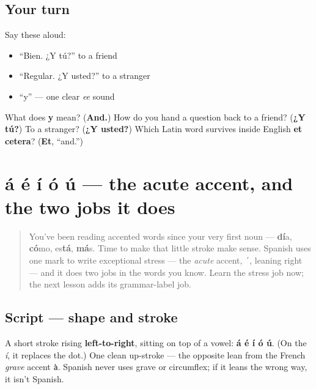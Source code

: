 \subsection*{Your turn}
Say these aloud:

\begin{itemize}
\raggedright
  \item “Bien. ¿Y tú?” to a friend
  \item “Regular. ¿Y usted?” to a stranger
  \item “y” — one clear \emph{ee} sound
\end{itemize}

\begin{tcolorbox}[breakable,colback=teal!4,colframe=teal!35!black,title={Before you move on}]
What does \textbf{y} mean? (\textbf{And.}) How do you hand a question back to a friend? (\textbf{¿Y tú?}) To a stranger? (\textbf{¿Y usted?}) Which Latin word survives inside English \textbf{et cetera}? (\textbf{Et}, “and.”)
\end{tcolorbox}
\section[á é í ó ú]{á é í ó ú — the acute accent, and the two jobs it does}

\label{lesson:ES-W01-acento}



\begin{quote}
You've been reading accented words since your very first noun — \textbf{dí}a, \textbf{có}mo, es\textbf{tá}, \textbf{má}s. Time to make that little stroke make sense. Spanish uses one mark to write exceptional stress — the \emph{acute} accent, \texttt{´}, leaning right — and it does two jobs in the words you know. Learn the stress job now; the next lesson adds its grammar-label job.
\end{quote}

\subsection*{Script — shape and stroke}
A short stroke rising \textbf{left-to-right}, sitting on top of a vowel: \textbf{á é í ó ú}. (On the \emph{í}, it replaces the dot.) One clean up-stroke — the opposite lean from the French \emph{grave} accent \texttt{à}. Spanish never uses grave or circumflex; if it leans the wrong way, it isn't Spanish.

